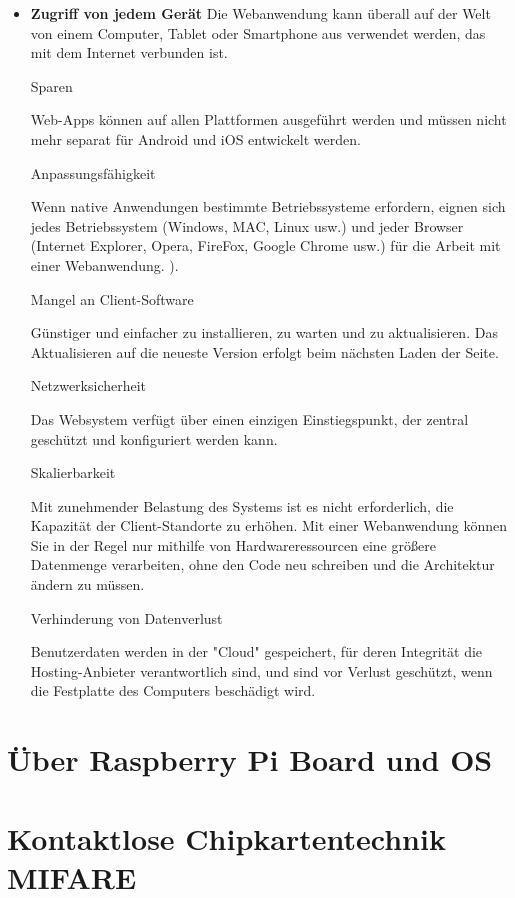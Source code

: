 \begin{itemize}
	\item \textbf{Zugriff von jedem Gerät} Die Webanwendung kann überall auf der Welt von einem Computer, Tablet oder Smartphone aus verwendet werden, das mit dem Internet verbunden ist.

Sparen

Web-Apps können auf allen Plattformen ausgeführt werden und müssen nicht mehr separat für Android und iOS entwickelt werden.

Anpassungsfähigkeit

Wenn native Anwendungen bestimmte Betriebssysteme erfordern, eignen sich jedes Betriebssystem (Windows, MAC, Linux usw.) und jeder Browser (Internet Explorer, Opera, FireFox, Google Chrome usw.) für die Arbeit mit einer Webanwendung. ).

Mangel an Client-Software

Günstiger und einfacher zu installieren, zu warten und zu aktualisieren. Das Aktualisieren auf die neueste Version erfolgt beim nächsten Laden der Seite.

Netzwerksicherheit

Das Websystem verfügt über einen einzigen Einstiegspunkt, der zentral geschützt und konfiguriert werden kann.

Skalierbarkeit

Mit zunehmender Belastung des Systems ist es nicht erforderlich, die Kapazität der Client-Standorte zu erhöhen. Mit einer Webanwendung können Sie in der Regel nur mithilfe von Hardwareressourcen eine größere Datenmenge verarbeiten, ohne den Code neu schreiben und die Architektur ändern zu müssen.

Verhinderung von Datenverlust

Benutzerdaten werden in der "Cloud" gespeichert, für deren Integrität die Hosting-Anbieter verantwortlich sind, und sind vor Verlust geschützt, wenn die Festplatte des Computers beschädigt wird.
\end{itemize}

\section{Über Raspberry Pi Board und OS}
\label{sec:theorie:raspberry}

\section{Kontaktlose Chipkartentechnik MIFARE}
\label{sec:theorie:mifare}

